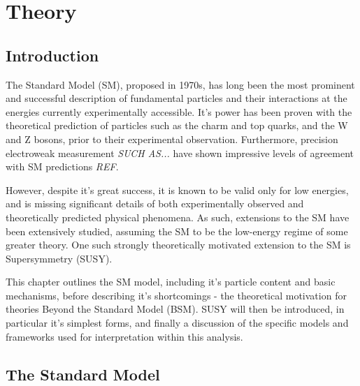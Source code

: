 
\chapter{Theory}
\label{ch:2}

\ifpdf
    \graphicspath{{Chapter2/Figs/Raster/}{Chapter2/Figs/PDF/}{Chapter2/Figs/}}
\else
    \graphicspath{{Chapter2/Figs/Vector/}{Chapter2/Figs/}}
\fi


\section{Introduction}  %
\label{sec:theory_intro}

The Standard Model (SM), proposed in 1970s, has long been the most prominent and 
successful description of fundamental particles and their interactions at the
energies currently experimentally accessible. It's power has been proven with the 
theoretical prediction of particles such as the charm and top quarks, and the W
and
Z bosons, prior to their experimental observation. Furthermore, precision 
electroweak measurement \emph{SUCH AS...} have shown impressive levels of 
agreement with SM predictions \emph{REF}.

However, despite it's great success, it is known to be valid only for low 
energies, and is missing significant details of both experimentally 
observed and theoretically predicted physical phenomena. As such, extensions to
the SM have been extensively studied, assuming the SM to be the low-energy 
regime of some greater theory. One such strongly theoretically motivated
extension to the SM is Supersymmetry (SUSY).

This chapter outlines the SM model, including it's particle content and basic 
mechanisms, before describing it's shortcomings - the theoretical 
motivation for theories Beyond the Standard Model (BSM). SUSY will then be 
introduced, in particular it's simplest forms, and finally a discussion of
the specific models and frameworks used for interpretation within this analysis.

\section{The Standard Model}
\label{sec:theory_current}

